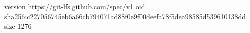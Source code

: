 version https://git-lfs.github.com/spec/v1
oid sha256:c227056745eb6a66cb794071ad88f0e9f00deefa78f5dea98585d539610138dd
size 1276
